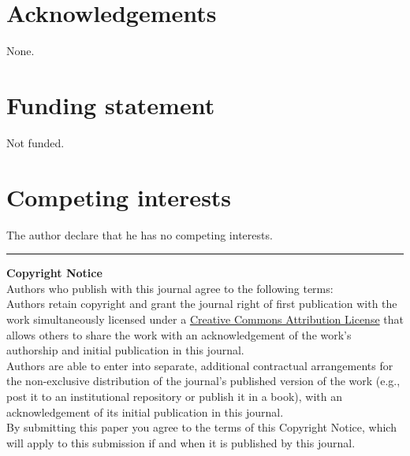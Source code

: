 \documentclass{jors}
\begin{document}
\section*{Acknowledgements}
None.

\section*{Funding statement}
Not funded.

\section*{Competing interests}
The author declare that he has no competing interests.



   
  




\vspace{2cm}

\rule{\textwidth}{1pt}

{ \bf Copyright Notice} \\
Authors who publish with this journal agree to the following terms: \\

Authors retain copyright and grant the journal right of first publication with the work simultaneously licensed under a  \href{http://creativecommons.org/licenses/by/3.0/}{Creative Commons Attribution License} that allows others to share the work with an acknowledgement of the work's authorship and initial publication in this journal. \\

Authors are able to enter into separate, additional contractual arrangements for the non-exclusive distribution of the journal's published version of the work (e.g., post it to an institutional repository or publish it in a book), with an acknowledgement of its initial publication in this journal. \\

By submitting this paper you agree to the terms of this Copyright Notice, which will apply to this submission if and when it is published by this journal.
\end{document}
